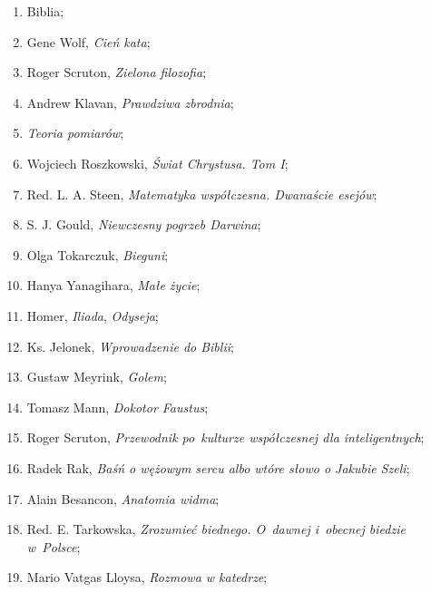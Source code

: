 \documentclass[a4paper,11pt]{article}
\begin{document}
\begin{enumerate}

\item Biblia;

\item Gene Wolf, \textit{Cień kata};

\item Roger Scruton, \textit{Zielona filozofia};

\item Andrew Klavan, \textit{Prawdziwa zbrodnia};

\item \textit{Teoria pomiarów};

\item Wojciech Roszkowski, \textit{Świat Chrystusa. Tom I};

\item Red. L. A. Steen, \textit{Matematyka współczesna. Dwanaście
    esejów};

\item S. J. Gould, \textit{Niewczesny pogrzeb Darwina};

\item Olga Tokarczuk, \textit{Bieguni};

\item Hanya Yanagihara, \textit{Małe życie};

\item Homer, \textit{Iliada}, \textit{Odyseja};

\item Ks. Jelonek, \textit{Wprowadzenie do Biblii};

\item Gustaw Meyrink, \textit{Golem};

\item Tomasz Mann, \textit{Dokotor Faustus};

\item Roger Scruton, \textit{Przewodnik po~kulturze współczesnej dla
    inteligentnych};

\item Radek Rak, \textit{Baśń o wężowym sercu albo wtóre słowo o Jakubie
    Szeli};

\item Alain Besancon, \textit{Anatomia widma};

\item Red. E. Tarkowska, \textit{Zrozumieć biednego. O~dawnej i~obecnej
    biedzie w~Polsce};

\item Mario Vatgas Lloysa, \textit{Rozmowa w katedrze};


\end{enumerate}
\end{document}
